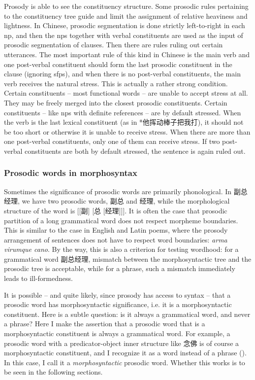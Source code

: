 \documentclass[UTF8, a4paper, oneside, scheme=plain]{ctexart}
\newcommand{\corpus}[1]{\emph{#1}}
\begin{document}
Prosody is able to see the constituency structure.
Some prosodic rules pertaining to the constituency tree 
guide and limit the assignment of relative heaviness and lightness.
In Chinese, prosodic segmentation is done strictly left-to-right 
in each \ac{np},
and then the \ac{np}s together with verbal constituents 
are used as the input of prosodic segmentation of clauses.
Then there are rules ruling out certain utterances.
The most important rule of this kind in Chinese is
the main verb and one post-verbal constituent
should form the last prosodic constituent in the clause (ignoring \ac{sfp}s),
and when there is no post-verbal constituents,
the main verb receives the natural stress. 
This is actually a rather strong condition.
Certain constituents -- most functional words -- are unable to accept stress at all.
They may be freely merged into the closest prosodic constituents.
Certain constituents -- like \ac{np}s with definite references -- are by default stressed.
When the verb is the last lexical constituent
(as in *他挥动棒子把我打),
it should not be too short or otherwise it is unable to receive stress.
When there are more than one post-verbal constituents,
only one of them can receive stress.
If two post-verbal constituents are both by default stressed,
the sentence is again ruled out. %

\subsubsection{Prosodic words in morphosyntax}\label{sec:prosodic-word-syntax}

Sometimes the significance of prosodic words are primarily phonological.
In 副总经理,
we have two prosodic words,
副总 and 经理,
while the morphological structure of the word is [[副] [总 [经理]]].
It is often the case that 
prosodic partition of a long grammatical word 
does not respect morpheme boundaries.
This is similar to the case in English and Latin poems,
where the prosody arrangement of sentences does not have to respect word boundaries:
\corpus{arma vi\textbar rumque ca\textbar no}.
By the way, this is also a criterion for testing wordhood:
for a grammatical word 副总经理,
mismatch between the morphosyntactic tree and the prosodic tree is acceptable,
while for a phrase,
such a mismatch immediately leads to ill-formedness.

It is possible
-- and quite likely, since prosody has access to syntax --
that a prosodic word has morphosyntactic significance, 
i.e. it is a morphosyntactic constituent.
Here is a subtle question:
is it always a grammatical word,
and never a phrase?
Here I make the assertion that a prosodic word that is a morphosyntactic constituent
is always a grammatical word.
For example, a prosodic word with a predicator-object inner structure 
like 念佛 is of course a morphosyntactic constituent,
and I recognize it as a word instead of a phrase ().
In this case, I call it a \emph{morphosyntactic} prosodic word.
Whether this works is to be seen in the following sections.
\end{document}
